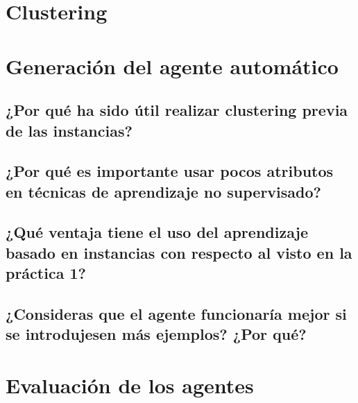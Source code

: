 \documentclass[12pt]{article}
\begin{document}
\section{Clustering}


\section{Generación del agente automático}


\subsection{¿Por qué ha sido útil realizar clustering previa de las instancias?}

\subsection{¿Por qué es importante usar pocos atributos en técnicas de aprendizaje no supervisado?}

\subsection{¿Qué ventaja tiene el uso del aprendizaje basado en instancias con respecto al visto en la práctica 1?}

\subsection{¿Consideras que el agente funcionaría mejor si se introdujesen más ejemplos? ¿Por qué?}



\section{Evaluación de los agentes}

\end{document}
